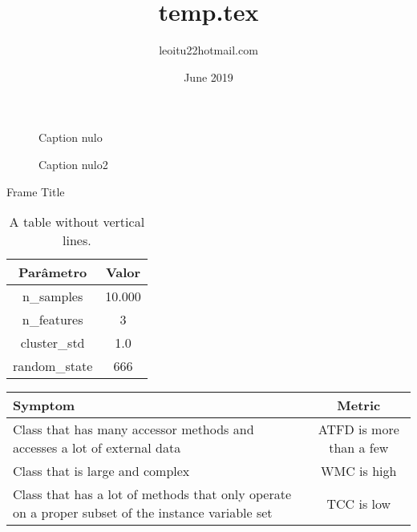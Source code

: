 \documentclass[bigger]{beamer}
\title{temp.tex}
\author{leoitu22hotmail.com }
\date{June 2019}
\newcommand\DeactivateBG{\backgroundsetup{contents={}}}
\begin{document}
{
    
    \begin{frame}
    
    \end{frame}
}

\begin{figure}[h]
 \caption{Caption nulo}
 \centering
 \label{fig:nada}
\end{figure}
\begin{figure}[h]
 \caption{Caption nulo2}
 \centering
 \label{fig:n}
\end{figure}

\begin{frame}{Frame Title}
\begin{table}[ht]
\centering
    \caption{A table without vertical lines.}
    \begin{tabular}[t]{|c|c|}
        \hline
         Parâmetro & Valor \\
         \hline
         n\_samples & 10.000\\
         \hline
         n\_features & 3\\
         \hline
         cluster\_std & 1.0\\
         \hline
         random\_state & 666\\
        \hline
    \end{tabular}
\end{table}%
\end{frame}

\begin{tabularx}{\textwidth}{|X|c|}
  \hline
  \textbf{Symptom} & \textbf{Metric} \\
\hline
Class that has many accessor methods and accesses a lot of external data & ATFD is more than a few\\
Class that is large and complex & WMC is high\\
Class that has a lot of methods that only operate on a proper subset of the instance variable set & TCC is low\\
\end{tabularx}
\end{document}

